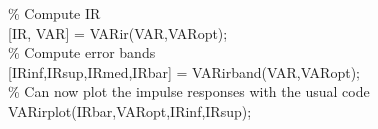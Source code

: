 \hspace{1mm}\hspace{5mm} \hspace{5mm} \hspace{5mm} \hspace{5mm} \hspace{5mm} \textcolor{matlabgreen}{\% Compute IR }\\ 
\hspace{1mm}\hspace{5mm} \hspace{5mm} \hspace{5mm} \hspace{5mm} \hspace{5mm} [IR, VAR] = VARir(VAR,VARopt); \\ 
\hspace{1mm}\hspace{5mm} \hspace{5mm} \hspace{5mm} \hspace{5mm} \hspace{5mm} \textcolor{matlabgreen}{\% Compute error bands }\\ 
\hspace{1mm}\hspace{5mm} \hspace{5mm} \hspace{5mm} \hspace{5mm} \hspace{5mm} [IRinf,IRsup,IRmed,IRbar] = VARirband(VAR,VARopt); \\ 
\hspace{1mm}\hspace{5mm} \hspace{5mm} \hspace{5mm} \hspace{5mm} \hspace{5mm} \textcolor{matlabgreen}{\% Can now plot the impulse responses with the usual code }\\ 
\hspace{1mm}\hspace{5mm} \hspace{5mm} \hspace{5mm} \hspace{5mm} \hspace{5mm} VARirplot(IRbar,VARopt,IRinf,IRsup); \\ 
\hspace{1mm}\hspace{5mm} \hspace{5mm} \hspace{5mm} \hspace{5mm} \hspace{5mm}  \\ 
